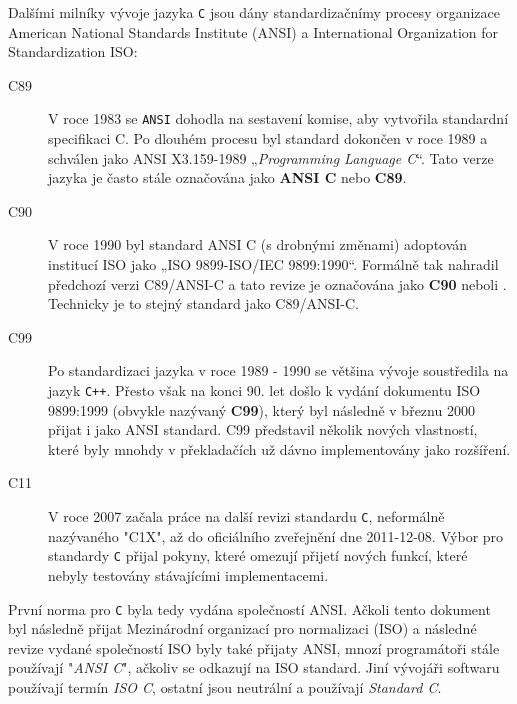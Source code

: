     Dalšími milníky vývoje jazyka \texttt{C} jsou dány standardizačnímy procesy organizace American 
    National Standards Institute (ANSI) a International Organization for Standardization ISO:
    \begin{description}
      \item[C89]    V roce 1983 se \texttt{ANSI} dohodla na sestavení komise, aby vytvořila 
                    standardní specifikaci C. Po dlouhém procesu byl standard dokončen v roce 1989 
                    a schválen jako ANSI X3.159-1989 „\emph{Programming Language C}“. Tato verze 
                    jazyka je často stále označována jako \textbf{ANSI C} nebo \textbf{C89}.
      \item[C90]    V roce 1990 byl standard ANSI C (s drobnými změnami) adoptován institucí ISO 
                    jako „ISO 9899-ISO/IEC 9899:1990“. Formálně tak nahradil předchozí verzi 
                    C89/ANSI-C a tato revize je označována jako \textbf{C90} neboli . 
                    Technicky je to stejný standard jako C89/ANSI-C.
      \item[C99]    Po standardizaci jazyka v roce 1989 - 1990 se většina vývoje soustředila na 
                    jazyk \texttt{C++}. Přesto však na konci 90. let došlo k vydání dokumentu ISO 
                    9899:1999 (obvykle nazývaný \textbf{C99}), který byl následně v březnu 2000 
                    přijat i jako ANSI standard. C99 představil několik nových vlastností, které 
                    byly mnohdy v překladačích už dávno implementovány jako rozšíření.
      \item[C11]    V roce 2007 začala práce na další revizi standardu \texttt{C}, neformálně 
                    nazývaného "C1X", až do oficiálního zveřejnění dne 2011-12-08. Výbor pro 
                    standardy \texttt{C} přijal pokyny, které omezují přijetí nových funkcí, které 
                    nebyly testovány stávajícími implementacemi.
    \end{description}
    
    \begin{note}
      První norma pro \texttt{C} byla tedy vydána společností ANSI. Ačkoli tento dokument byl 
      následně přijat Mezinárodní organizací pro normalizaci (ISO) a následné revize vydané 
      společností ISO byly také přijaty ANSI, mnozí programátoři stále používají "\emph{ANSI C}", 
      ačkoliv se odkazují na ISO standard. Jiní vývojáři softwaru používají termín \emph{ISO C}, 
      ostatní jsou neutrální a používají \emph{Standard C}.
    \end{note}
  
